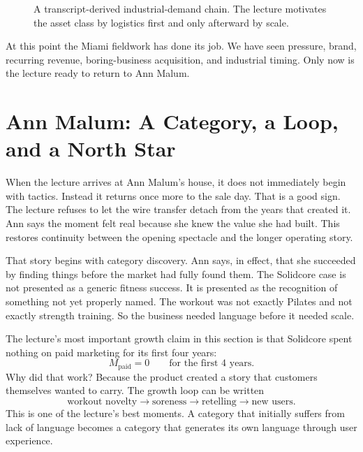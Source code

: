\begin{figure}[h]
\centering
{}
\caption{A transcript-derived industrial-demand chain. The lecture motivates the asset class by logistics first and only afterward by scale.}
\end{figure}

At this point the Miami fieldwork has done its job. We have seen pressure, brand, recurring revenue, boring-business acquisition, and industrial timing. Only now is the lecture ready to return to Ann Malum.

\section{Ann Malum: A Category, a Loop, and a North Star}

When the lecture arrives at Ann Malum's house, it does not immediately begin with tactics. Instead it returns once more to the sale day. That is a good sign. The lecture refuses to let the wire transfer detach from the years that created it. Ann says the moment felt real because she knew the value she had built. This restores continuity between the opening spectacle and the longer operating story.

That story begins with category discovery. Ann says, in effect, that she succeeded by finding things before the market had fully found them. The Solidcore case is not presented as a generic fitness success. It is presented as the recognition of something not yet properly named. The workout was not exactly Pilates and not exactly strength training. So the business needed language before it needed scale.

The lecture's most important growth claim in this section is that Solidcore spent nothing on paid marketing for its first four years:
\begin{equation}
M_{\mathrm{paid}} = 0
\qquad
\text{for the first }4\text{ years.}
\end{equation}
Why did that work? Because the product created a story that customers themselves wanted to carry. The growth loop can be written
\begin{equation}
\text{workout novelty} \to \text{soreness} \to \text{retelling} \to \text{new users}.
\end{equation}
This is one of the lecture's best moments. A category that initially suffers from lack of language becomes a category that generates its own language through user experience.

